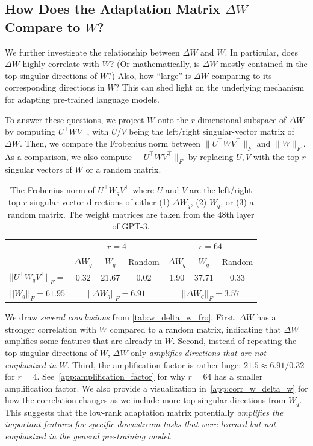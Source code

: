\documentclass{article} %
\begin{document}
\subsection{How Does the Adaptation Matrix $\Delta W$ Compare to $W$?}
\label{sec:compare_delta_w_to_w}
We further investigate the relationship between $\Delta W$ and $W$.
In particular, does $\Delta W$ highly correlate with $W$? (Or mathematically, is $\Delta W$ mostly contained in the top singular directions of $W$?) Also, how ``large'' is $\Delta W$ comparing to its corresponding directions in $W$?
This can shed light on the underlying mechanism for adapting pre-trained language models.

To answer these questions, we project $W$ onto the $r$-dimensional subspace of $\Delta W$ by computing $U^\top W V^\top$, with $U$/$V$ being the left/right singular-vector matrix of $\Delta W$. Then, we compare the Frobenius norm between $\|U^\top W V^\top\|_F$ and $\|W\|_F$.
As a comparison, we also compute $\|U^\top W V^\top\|_F$ by replacing $U,V$ with the top $r$ singular vectors of $W$ or a random matrix.



\begin{table}[h]
  \centering
  \begin{tabular}{c|ccc|ccc}
  \hline
  \toprule
                             & \multicolumn{3}{c|}{$r=4$}             & \multicolumn{3}{c}{$r=64$}           \\
                                 & $\Delta W_q$ & $W_q$ & Random  &  $\Delta W_q$ & $W_q$  &  Random \\
  \midrule
  $||U^\top W_qV^\top||_F = $        & 0.32   & 21.67     & 0.02     & 1.90  & 37.71                & 0.33    \\
  \midrule
  $||W_q||_F = 61.95$                & \multicolumn{3}{c|}{$||\Delta W_q||_F = 6.91$}
  & \multicolumn{3}{c}{$||\Delta W_q||_F = 3.57$}
  \\
  \bottomrule
  \end{tabular}
  \caption{The Frobenius norm of $U^\top W_qV^\top$ where $U$ and $V$ are the left/right top $r$ singular vector directions of either (1) $\Delta W_q$, (2) $W_q$, or (3) a random matrix. The weight matrices are taken from the 48th layer of GPT-3.
  }
  \label{tab:w_delta_w_fro}
\end{table}

We draw \emph{several conclusions} from \autoref{tab:w_delta_w_fro}.
First, $\Delta W$ has a stronger correlation with $W$ compared to a random matrix, indicating that $\Delta W$ amplifies some features that are already in $W$.
Second, instead of repeating the top singular directions of $W$, $\Delta W$ only \emph{amplifies directions that are not emphasized in $W$}.
Third, the amplification factor is rather huge: $21.5\approx 6.91/0.32$ for $r=4$.
See~\autoref{app:amplification_factor} for why $r=64$ has a smaller amplification factor.
We also provide a visualization in~\autoref{app:corr_w_delta_w} for how the correlation changes as we include more top singular directions from $W_q$.
This suggests that the low-rank adaptation matrix potentially \emph{amplifies the important features for specific downstream tasks that were learned but not emphasized in the general pre-training model}.
\end{document}
